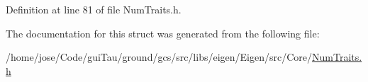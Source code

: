 Definition at line 81 of file Num\-Traits.\-h.



The documentation for this struct was generated from the following file\-:\begin{DoxyCompactItemize}
\item 
/home/jose/\-Code/gui\-Tau/ground/gcs/src/libs/eigen/\-Eigen/src/\-Core/\hyperlink{_num_traits_8h}{Num\-Traits.\-h}\end{DoxyCompactItemize}
